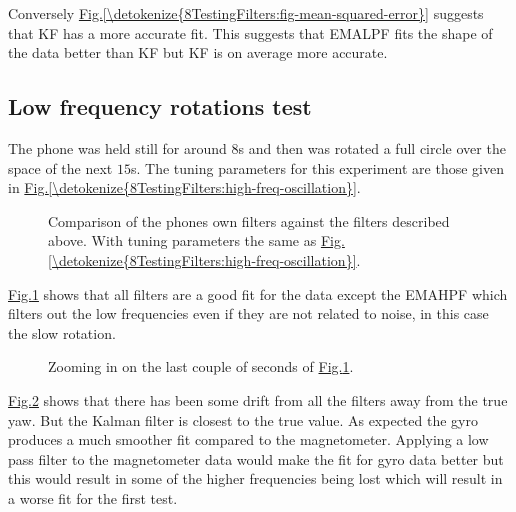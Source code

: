 \documentclass[letterpaper,10pt,english]{jupyterBook}
\begin{document}
\sphinxAtStartPar
Conversely \hyperref[\detokenize{8TestingFilters:fig-mean-squared-error}]{Fig.\@ \ref{\detokenize{8TestingFilters:fig-mean-squared-error}}} suggests that KF has a more accurate fit. This suggests that EMALPF fits the shape of the data better than KF but KF is on average more accurate.


\subsection{Low frequency rotations test}
\label{\detokenize{8TestingFilters:low-frequency-rotations-test}}
\sphinxAtStartPar
The phone was held still for around \(8\)s and then was rotated a full circle over the space of the next \(15\)s. The tuning parameters for this experiment are those given in \hyperref[\detokenize{8TestingFilters:high-freq-oscillation}]{Fig.\@ \ref{\detokenize{8TestingFilters:high-freq-oscillation}}}.

\begin{figure}[htbp]
\centering
\capstart

\noindent{}
\caption{Comparison of the phones own filters against the filters described above. With tuning parameters the same as \hyperref[\detokenize{8TestingFilters:high-freq-oscillation}]{Fig.\@ \ref{\detokenize{8TestingFilters:high-freq-oscillation}}}.}\label{\detokenize{8TestingFilters:fig-low-frequency-rotations}}\end{figure}

\sphinxAtStartPar
\hyperref[\detokenize{8TestingFilters:fig-low-frequency-rotations}]{Fig.\@ \ref{\detokenize{8TestingFilters:fig-low-frequency-rotations}}} shows that all filters are a good fit for the data except the EMAHPF which filters out the low frequencies even if they are not related to noise, in this case the slow rotation.

\begin{figure}[htbp]
\centering
\capstart

\noindent{}
\caption{Zooming in on the last couple of seconds of \hyperref[\detokenize{8TestingFilters:fig-low-frequency-rotations}]{Fig.\@ \ref{\detokenize{8TestingFilters:fig-low-frequency-rotations}}}.}\label{\detokenize{8TestingFilters:fig-low-frequency-rotations-zoom}}\end{figure}

\sphinxAtStartPar
\hyperref[\detokenize{8TestingFilters:fig-low-frequency-rotations-zoom}]{Fig.\@ \ref{\detokenize{8TestingFilters:fig-low-frequency-rotations-zoom}}} shows that there has been some drift from all the filters away from the true yaw. But the Kalman filter is closest to the true value. As expected the gyro produces a much smoother fit compared to the magnetometer. Applying a low pass filter to the magnetometer data would make the fit for gyro data better but this would result in some of the higher frequencies being lost which will result in a worse fit for the first test.
\end{document}
